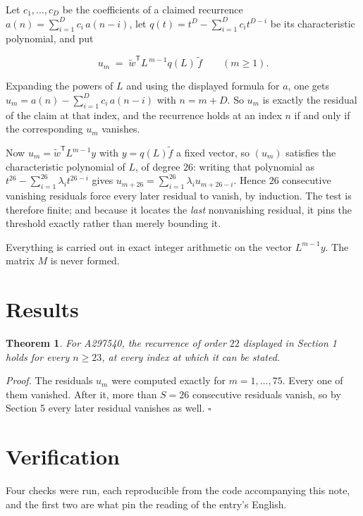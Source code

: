 \documentclass[11pt]{article}
\newtheorem{theorem}{Theorem}
\theoremstyle{definition}
\begin{document}
Let $c_1,\dots,c_D$ be the coefficients of a claimed recurrence $a(n) = \sum_{i=1}^{D} c_i\,a(n-i)$, let $q(t) = t^{D} - \sum_{i=1}^{D} c_i t^{D-i}$ be its characteristic polynomial, and put

\[u_m \;=\; \tilde w^{\mathsf T} L^{\,m-1} q(L)\,\tilde f \qquad (m \ge 1).\]

Expanding the powers of $L$ and using the displayed formula for $a$, one gets $u_m = a(n) - \sum_{i=1}^{D} c_i\,a(n-i)$ with $n = m + D$. So $u_m$ is exactly the residual of the claim at that index, and the recurrence holds at an index $n$ if and only if the corresponding $u_m$ vanishes.

Now $u_m = \tilde w^{\mathsf T} L^{m-1} y$ with $y = q(L)\tilde f$ a fixed vector, so $(u_m)$ satisfies the characteristic polynomial of $L$, of degree $26$: writing that polynomial as $t^{26} - \sum_{i=1}^{26} \lambda_i t^{26-i}$ gives $u_{m+26} = \sum_{i=1}^{26} \lambda_i u_{m+26-i}$. Hence $26$ consecutive vanishing residuals force every later residual to vanish, by induction. The test is therefore finite; and because it locates the {\itshape last} nonvanishing residual, it pins the threshold exactly rather than merely bounding it.

Everything is carried out in exact integer arithmetic on the vector $L^{m-1}y$. The matrix $M$ is never formed.

\section{Results}

\begin{theorem} For A297540, the recurrence of order $22$ displayed in Section 1 holds for every $n \ge 23$, at every index at which it can be stated.\end{theorem}

{\itshape Proof.} The residuals $u_m$ were computed exactly for $m = 1,\dots,75$. Every one of them vanished. After it, more than $S = 26$ consecutive residuals vanish, so by Section 5 every later residual vanishes as well. $\square$

\section{Verification}

Four checks were run, each reproducible from the code accompanying this note, and the first two are what pin the reading of the entry's English.
\end{document}
